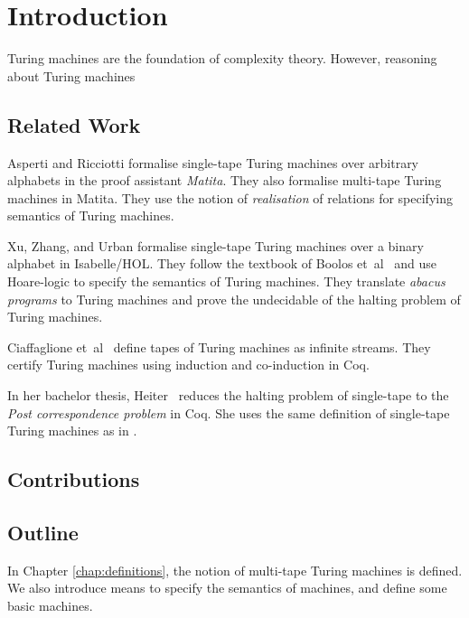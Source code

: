\chapter{Introduction}
\label{chap:intro}


Turing machines are the foundation of complexity theory.  However, reasoning about Turing machines 


\section{Related Work}
\label{sec:relatedwork}


Asperti and Ricciotti \cite{asperti2012} formalise single-tape Turing machines over arbitrary alphabets in the proof assistant \textit{Matita}.  They
also \cite{asperti2015} formalise multi-tape Turing machines in Matita.  They use the notion of \textit{realisation} of relations for specifying
semantics of Turing machines.

Xu, Zhang, and Urban \cite{Xu:2013:MTM:2529315.2529331} formalise single-tape Turing machines over a binary alphabet in Isabelle/HOL.  They follow the
textbook of Boolos et~al~\cite{boolos2007computability} and use Hoare-logic to specify the semantics of Turing machines.  They translate
\textit{abacus programs} to Turing machines and prove the undecidable of the halting problem of Turing machines.

Ciaffaglione et~al~\cite{Ciaffaglione:2016:TTC:2956213.2956306} define tapes of Turing machines as infinite streams.  They certify Turing machines
using induction and co-induction in Coq.

In her bachelor thesis, Heiter~\cite{Heiter} reduces the halting problem of single-tape to the \textit{Post correspondence problem} in Coq.  She uses
the same definition of single-tape Turing machines as in \cite{asperti2012}.


\section{Contributions}
\label{sec:contributions}

\section{Outline}
\label{sec:outline}

In Chapter \ref{chap:definitions}, the notion of multi-tape Turing machines is defined.  We also introduce means to specify the semantics of machines,
and define some basic machines.

